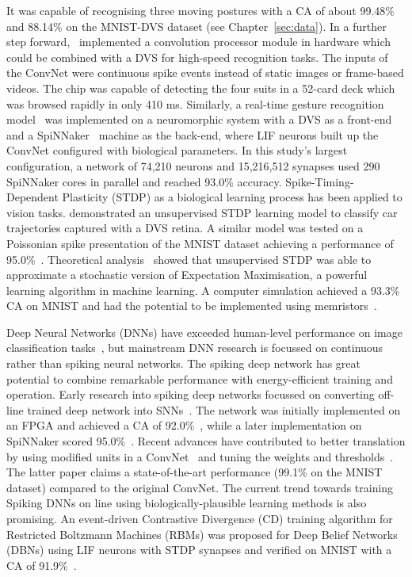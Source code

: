 \documentclass{frontiersENG} %
\begin{document}
It was capable of recognising three moving postures with a CA of about 99.48\% and 88.14\% on the MNIST-DVS dataset (see Chapter~\ref{sec:data}).
In a further step forward,~\cite{camunas2012event} implemented a convolution processor module in hardware which could be combined with a DVS for high-speed recognition tasks.
The inputs of the ConvNet were continuous spike events instead of static images or frame-based videos. 
The chip was capable of detecting the four suits in a 52-card deck which was browsed rapidly in only 410 ms.
Similarly, a real-time gesture recognition model~\citep{liu2014real} was implemented on a neuromorphic system with a DVS as a front-end and a SpiNNaker~\citep{furber2014spinnaker} machine as the back-end, where LIF neurons built up the ConvNet configured with biological parameters.
In this study's largest configuration, a network of 74,210 neurons and 15,216,512 synapses used 290 SpiNNaker cores in parallel and reached 93.0\% accuracy. 
Spike-Timing-Dependent Plasticity (STDP) as a biological learning process has been applied to vision tasks.
\cite{bichler2012extraction} demonstrated an unsupervised STDP learning model to classify car trajectories captured with a DVS retina. 
A similar model was tested on a Poissonian spike presentation of the MNIST dataset achieving a performance of 95.0\%~\citep{diehl2015unsupervised}.
Theoretical analysis~\citep{nessler2013bayesian} showed that unsupervised STDP was able to approximate a stochastic version of Expectation Maximisation, a powerful learning algorithm in machine learning.
A computer simulation achieved a 93.3\% CA on MNIST and had the potential to be implemented using memristors~\citep{bill2014compound}. 

Deep Neural Networks (DNNs) have exceeded human-level performance on image classification tasks~\cite{he2015delving}, but mainstream DNN research is focussed on continuous rather than spiking neural networks.
The spiking deep network has great potential to combine remarkable performance with energy-efficient training and operation.
Early research into spiking deep networks focussed on converting off-line trained deep network into SNNs~\citep{o2013real}.
The network was initially implemented on an FPGA and achieved a CA of 92.0\%~\citep{neil2014minitaur}, while a later implementation on SpiNNaker scored 95.0\%~\citep{Stromatias2015scalable}.
Recent advances have contributed to better translation by using modified units in a ConvNet~\citep{cao2015spiking} and tuning the weights and thresholds~\citep{Diehl2015fast}.
The latter paper claims a state-of-the-art performance (99.1\% on the MNIST dataset) compared to the original ConvNet.
The current trend towards training Spiking DNNs on line using biologically-plausible learning methods is also promising.
An event-driven Contrastive Divergence (CD) training algorithm for Restricted Boltzmann Machines (RBMs) was proposed for Deep Belief Networks (DBNs) using LIF neurons with STDP synapses and verified on MNIST with a CA of 91.9\%~\citep{neftci2013event}.
\end{document}
